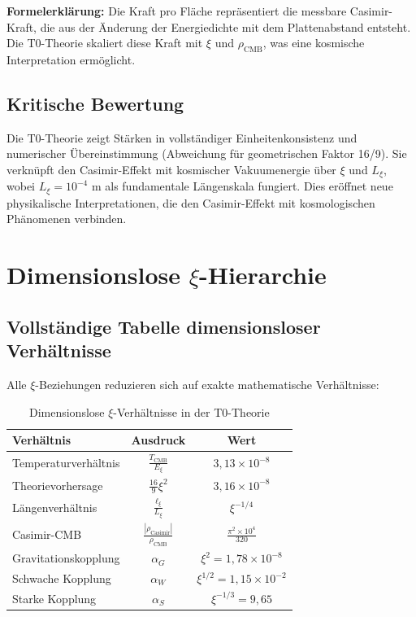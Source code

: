 	\textbf{Formelerklärung:} Die Kraft pro Fläche repräsentiert die messbare Casimir-Kraft, die aus der Änderung der Energiedichte mit dem Plattenabstand entsteht. Die T0-Theorie skaliert diese Kraft mit $\xi$ und $\rho_{\text{CMB}}$, was eine kosmische Interpretation ermöglicht.
	
	\subsection{Kritische Bewertung}
	Die T0-Theorie zeigt Stärken in vollständiger Einheitenkonsistenz und numerischer Übereinstimmung (Abweichung für geometrischen Faktor 16/9). Sie verknüpft den Casimir-Effekt mit kosmischer Vakuumenergie über $\xi$ und $L_\xi$, wobei $L_\xi = 10^{-4}$ m als fundamentale Längenskala fungiert. Dies eröffnet neue physikalische Interpretationen, die den Casimir-Effekt mit kosmologischen Phänomenen verbinden.
	
	\section{Dimensionslose $\xi$-Hierarchie}
	
	\subsection{Vollständige Tabelle dimensionsloser Verhältnisse}
	
	Alle $\xi$-Beziehungen reduzieren sich auf exakte mathematische Verhältnisse:
	
	\begin{table}[htbp]
		\centering
		\caption{Dimensionslose $\xi$-Verhältnisse in der T0-Theorie}
		\begin{tabular}{lcc}
			\toprule
			\textbf{Verhältnis} & \textbf{Ausdruck} & \textbf{Wert} \\
			\midrule
			Temperaturverhältnis & $\frac{T_{\text{CMB}}}{E_\xi}$ & $3,13 \times 10^{-8}$ \\
			Theorievorhersage & $\frac{16}{9}\xi^2$ & $3,16 \times 10^{-8}$ \\
			Längenverhältnis & $\frac{\ell_{\xi}}{L_\xi}$ & $\xi^{-1/4}$ \\
			Casimir-CMB & $\frac{|\rho_{\text{Casimir}}|}{\rho_{\text{CMB}}}$ & $\frac{\pi^2 \times 10^4}{320}$ \\
			Gravitationskopplung & $\alpha_G$ & $\xi^2 = 1,78 \times 10^{-8}$ \\
			Schwache Kopplung & $\alpha_W$ & $\xi^{1/2} = 1,15 \times 10^{-2}$ \\
			Starke Kopplung & $\alpha_S$ & $\xi^{-1/3} = 9,65$ \\
			\bottomrule
		\end{tabular}
	\end{table}
	

